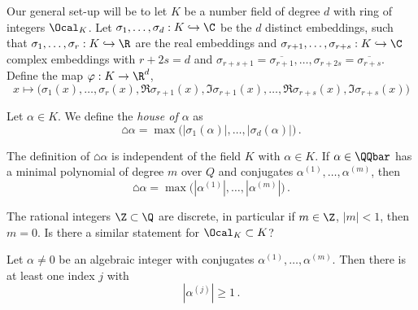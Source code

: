 Our general set-up will be to let \( K \) be a number field of degree \( d \) with ring of integers \( \Ocal_K \).
Let \( \sigma_1, \dotsc, \sigma_d: K \hookrightarrow \C \) be the \( d \) distinct embeddings, such that \( \sigma_1, \dotsc, \sigma_r: K \hookrightarrow \R \) are the real embeddings and \( \sigma_{r+1}, \dotsc, \sigma_{r+s}: K \hookrightarrow \C \) complex embeddings with \( r + 2s = d \) and \( \sigma_{r+s+1} = \overline{\sigma_{r+1}}, \dotsc, \sigma_{r+2s} = \overline{\sigma_{r+s}} \).
Define the map \( \varphi: K \to \R^d \),
\[ x \mapsto \big( \sigma_1(x), \dotsc, \sigma_r(x), \Re \sigma_{r+1}(x), \Im \sigma_{r+1}(x), \dotsc, \Re \sigma_{r+s}(x), \Im \sigma_{r+s}(x) \big) \]

\begin{defn*}[House]
	Let \( \alpha \in K \).
	We define the \emph{house of \( \alpha \)} as
	\[ \house{\alpha} = \max \big( |\sigma_1(\alpha)|, \dotsc, |\sigma_d(\alpha)| \big) \,. \]
\end{defn*}

\begin{rem*}
	The definition of \( \house{\alpha} \) is independent of the field \( K \) with \( \alpha \in K \).
	If \( \alpha \in \QQbar \) has a minimal polynomial of degree \( m \) over \( Q \) and conjugates \( \alpha^{(1)}, \dotsc, \alpha^{(m)} \), then
	\[ \house{\alpha} = \max \big( |\alpha^{(1)}|, \dotsc, |\alpha^{(m)}| \big) \,. \]
\end{rem*}

\begin{frage*}
	The rational integers \( \Z \subset \Q \) are discrete, in particular if \( m \in \Z \), \( |m| < 1 \), then \( m=0 \).
	Is there a similar statement for \( \Ocal_K \subset K \)?
\end{frage*}

\begin{obs*}
	Let \( \alpha \neq 0 \) be an algebraic integer with conjugates \( \alpha^{(1)}, \dotsc, \alpha^{(m)} \).
	Then there is at least one index \( j \) with
	\[ |\alpha^{(j)}| \geq 1 \,. \]
\end{obs*}